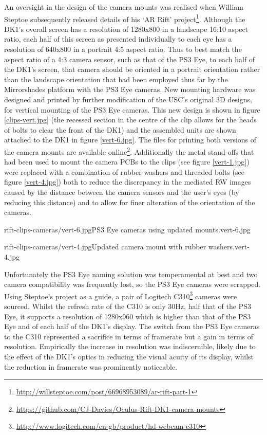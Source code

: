 An oversight in the design of the camera mounts was realised when William Steptoe subsequently released details of his `AR Rift' project\footnote{\url{http://willsteptoe.com/post/66968953089/ar-rift-part-1}}. Although the DK1's overall screen has a resolution of 1280x800 in a landscape 16:10 aspect ratio, each half of this screen as presented individually to each eye has a resolution of 640x800 in a portrait 4:5 aspect ratio. Thus to best match the aspect ratio of a 4:3 camera sensor, such as that of the PS3 Eye, to each half of the DK1's screen, that camera should be oriented in a portrait orientation rather than the landscape orientation that had been employed thus far by the Mirrorshades platform with the PS3 Eye cameras. New mounting hardware was designed and printed by further modification of the USC's original 3D designs, for vertical mounting of the PS3 Eye cameras. This new design is shown in figure \ref{clips-vert.jpg} (the recessed section in the centre of the clip allows for the heads of bolts to clear the front of the DK1) and the assembled units are shown attached to the DK1 in figure \ref{vert-6.jpg}. The files for printing both versions of the camera mounts are available online\footnote{\url{https://github.com/CJ-Davies/Oculus-Rift-DK1-camera-mounts}}. Additionally the metal stand-offs that had been used to mount the camera PCBs to the clips (see figure \ref{vert-1.jpg}) were replaced with a combination of rubber washers and threaded bolts (see figure \ref{vert-4.jpg}) both to reduce the discrepancy in the mediated RW images caused by the distance between the camera sensors and the user's eyes (by reducing this distance) and to allow for finer alteration of the orientation of the cameras.

       {rift-clips-cameras/vert-6.jpg}{PS3 Eye cameras using updated mounts.}{vert-6.jpg}

       {rift-clips-cameras/vert-4.jpg}{Updated camera mount with rubber washers.}{vert-4.jpg}

Unfortunately the PS3 Eye naming solution was temperamental at best and two camera compatibility was frequently lost, so the PS3 Eye cameras were scrapped. Using Steptoe's project as a guide, a pair of Logitech C310\footnote{\url{http://www.logitech.com/en-gb/product/hd-webcam-c310}} cameras were sourced. Whilst the refresh rate of the C310 is only 30Hz, half that of the PS3 Eye, it supports a resolution of 1280x960 which is higher than that of the PS3 Eye and of each half of the DK1's display. The switch from the PS3 Eye cameras to the C310 represented a sacrifice in terms of framerate but a gain in terms of resolution. Empirically the increase in resolution was indiscernible, likely due to the effect of the DK1's optics in reducing the visual acuity of its display, whilst the reduction in framerate was prominently noticeable.

